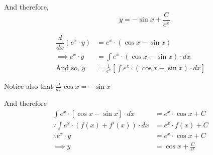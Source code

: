 \documentclass[14pt,fleqn]{extarticle}
\begin{document}
And therefore, 
\[ \qquad \qquad y = -\sin x + \dfrac{C}{e^x} \]

\newcard 

\begin{align}
\dfrac{d}{dx} \left(e^x\cdot y \right) &= e^x\cdot \left(\cos x - \sin x \right) \\
\implies e^x\cdot y &= \int e^x\cdot \left(\cos x -\sin x \right)\cdot dx \\
\text{And so, } y &= \frac{1}{e^x} \left[\int e^x\cdot \left(\cos x - \sin x \right) \cdot dx \right]
\end{align}

Notice also that $\frac{d}{dx}\cos x = -\sin x$ \newline 

And therefore 
\begin{align}
\int e^x\cdot \left[\cos x -\sin x \right]\cdot dx &= e^x\cdot \cos x + C \\ 
\because \int e^x\cdot \left(f(x) + f'(x) \right)\cdot dx &= e^x \cdot f(x) + C  \\
\therefore e^x\cdot y &= e^x\cdot \cos x + C  \\
\implies y &= \cos x + \frac{C}{e^x} 
\end{align}
\end{document}
